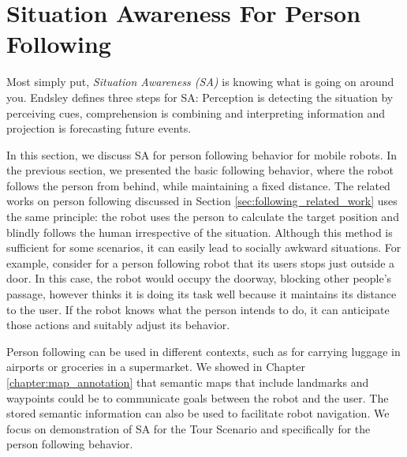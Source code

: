 \documentclass[12pt]{gatech-thesis}
\begin{document}














\section{Situation Awareness For Person Following}
\label{sec:following_situation_aware}

Most simply put, \textit{Situation Awareness (SA)} is knowing what is going on around you. Endsley \cite{endsley2000situation} defines three steps for SA: Perception is detecting the situation by perceiving cues, comprehension is combining and interpreting information and projection is forecasting future events.

In this section, we discuss SA for person following behavior for mobile robots. In the previous section, we presented the basic following behavior, where the robot follows the person from behind, while maintaining a fixed distance. The related works on person following discussed in Section \ref{sec:following_related_work} uses the same principle: the robot uses the person to calculate the target position and blindly follows the human irrespective of the situation. Although this method is sufficient for some scenarios, it can easily lead to socially awkward situations. For example, consider for a person following robot that its users stops just outside a door. In this case, the robot would occupy the doorway, blocking other people's passage, however thinks it is doing its task well because it maintains its distance to the user. If the robot knows what the person intends to do, it can anticipate those actions and suitably adjust its behavior.

Person following can be used in different contexts, such as for carrying luggage in airports or groceries in a supermarket. We showed in Chapter \ref{chapter:map_annotation} that semantic maps that include landmarks and waypoints could be to communicate goals between the robot and the user.  The stored semantic information can also be used to facilitate robot navigation. We focus on demonstration of SA for the Tour Scenario and specifically for the person following behavior.
\end{document}
